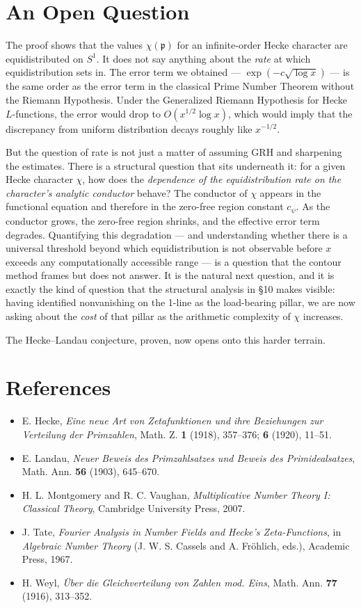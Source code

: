 \documentclass[12pt,a4paper]{article}
\newcommand{\pilcrow}{\S}
\begin{document}
\section{An Open Question}

The proof shows that the values $\chi(\mathfrak{p})$ for an infinite-order Hecke character are equidistributed on $S^1$. It does not say anything about the \emph{rate} at which equidistribution sets in. The error term we obtained --- $\exp(-c\sqrt{\log x})$ --- is the same order as the error term in the classical Prime Number Theorem without the Riemann Hypothesis. Under the Generalized Riemann Hypothesis for Hecke $L$-functions, the error would drop to $O(x^{1/2} \log x)$, which would imply that the discrepancy from uniform distribution decays roughly like $x^{-1/2}$.

But the question of rate is not just a matter of assuming GRH and sharpening the estimates. There is a structural question that sits underneath it: for a given Hecke character $\chi$, how does the \emph{dependence of the equidistribution rate on the character's analytic conductor} behave? The conductor of $\chi$ appears in the functional equation and therefore in the zero-free region constant $c_{\psi}$. As the conductor grows, the zero-free region shrinks, and the effective error term degrades. Quantifying this degradation --- and understanding whether there is a universal threshold beyond which equidistribution is not observable before $x$ exceeds any computationally accessible range --- is a question that the contour method frames but does not answer. It is the natural next question, and it is exactly the kind of question that the structural analysis in \pilcrow{}10 makes visible: having identified nonvanishing on the 1-line as the load-bearing pillar, we are now asking about the \emph{cost} of that pillar as the arithmetic complexity of $\chi$ increases.

The Hecke--Landau conjecture, proven, now opens onto this harder terrain.

\section{References}

\begin{itemize}
    \item E. Hecke, \emph{Eine neue Art von Zetafunktionen und ihre Beziehungen zur Verteilung der Primzahlen}, Math. Z. \textbf{1} (1918), 357--376; \textbf{6} (1920), 11--51.
    \item E. Landau, \emph{Neuer Beweis des Primzahlsatzes und Beweis des Primidealsatzes}, Math. Ann. \textbf{56} (1903), 645--670.
    \item H. L. Montgomery and R. C. Vaughan, \emph{Multiplicative Number Theory I: Classical Theory}, Cambridge University Press, 2007.
    \item J. Tate, \emph{Fourier Analysis in Number Fields and Hecke's Zeta-Functions}, in \emph{Algebraic Number Theory} (J. W. S. Cassels and A. Fröhlich, eds.), Academic Press, 1967.
    \item H. Weyl, \emph{Über die Gleichverteilung von Zahlen mod. Eins}, Math. Ann. \textbf{77} (1916), 313--352.
\end{itemize}
\end{document}
